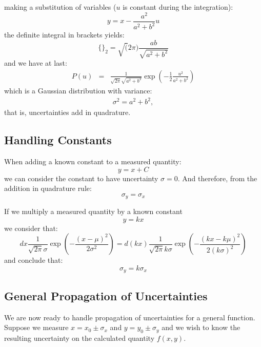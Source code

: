 \documentclass[12pt]{article}
\begin{document}
making a substitution of variables ($u$ is constant during the integration):
\begin{equation*}
y = x-\frac{a^2}{a^2+b^2}u
\end{equation*}
the definite integral in brackets yields:
\begin{equation}
\{\}_2 = \sqrt(2 \pi) \frac{a b}{\sqrt{a^2+b^2}}
\end{equation}
and we have at last:
\begin{eqnarray*}
P(u) &=& \frac{1}{\sqrt{2\pi} \sqrt{a^2+b^2}}  \exp \left( -\frac{1}{2} \frac{u^2}{a^2+b^2} \right)
\end{eqnarray*}
which is a Gaussian distribution with variance:
\begin{eqnarray*}
\sigma^2 = a^2 + b^2,
\end{eqnarray*}
that is, uncertainties add in quadrature.

\subsection{Handling Constants}

When adding a known constant to a measured quantity:
\begin{equation*}
y = x + C
\end{equation*}
we can consider the constant to have uncertainty $\sigma=0$.  And therefore, from the addition in quadrature rule:
\begin{equation*}
\sigma_y = \sigma_x
\end{equation*}

If we multiply a measured quantity by a known constant 
\begin{equation*}
y = k x 
\end{equation*}
we consider that:
\begin{displaymath}
dx \frac{1}{\sqrt{2\pi} \sigma} \exp\left(-\frac{(x-\mu)^2}{2\sigma^2}\right) = d(kx) \frac{1}{\sqrt{2\pi} k\sigma} \exp\left(-\frac{(kx-k\mu)^2}{2(k\sigma)^2}\right)
\end{displaymath}
and conclude that:
\begin{equation*}
\sigma_y = k \sigma_x
\end{equation*}

\subsection{General Propagation of Uncertainties}
We are now ready to handle propagation of uncertainties for a general function.  Suppose we measure $x = x_0 \pm \sigma_x$ and $y = y_0 \pm \sigma_y$ and we wish to know the resulting uncertainty on the calculated quantity $f(x,y)$.
\end{document}
